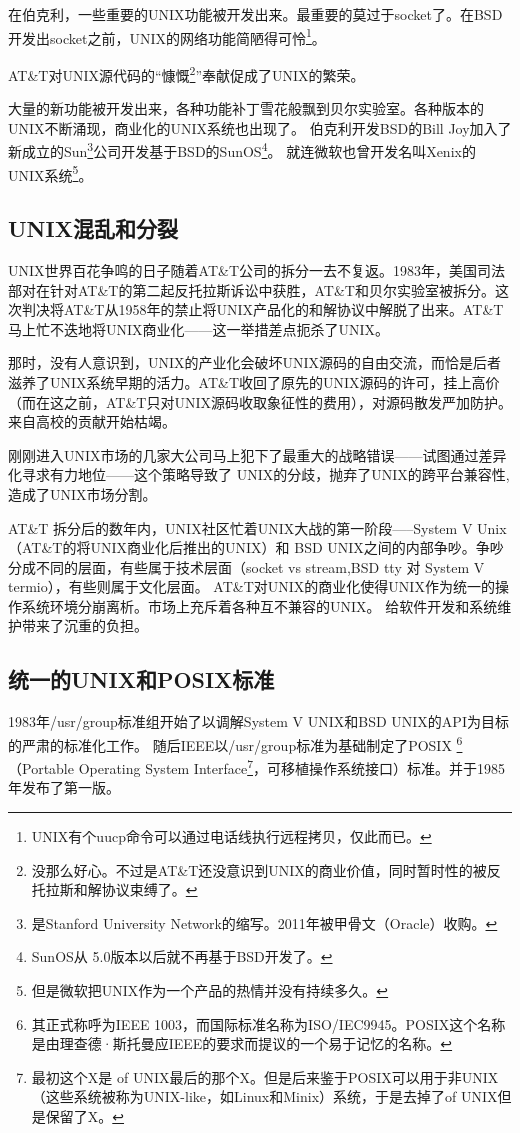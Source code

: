\documentclass[amstex]{ctexbook}
\begin{document}
在伯克利，一些重要的UNIX功能被开发出来。最重要的莫过于socket了。在BSD开发出socket之前，UNIX的网络功能简陋得可怜\footnote{UNIX有个uucp命令可以通过电话线执行远程拷贝，仅此而已。}。


AT\&T对UNIX源代码的“慷慨\footnote{没那么好心。不过是AT\&T还没意识到UNIX的商业价值，同时暂时性的被反托拉斯和解协议束缚了。}”奉献促成了UNIX的繁荣。

大量的新功能被开发出来，各种功能补丁雪花般飘到贝尔实验室。各种版本的UNIX不断涌现，商业化的UNIX系统也出现了。
伯克利开发BSD的Bill Joy加入了新成立的Sun\footnote{是Stanford University Network的缩写。2011年被甲骨文（Oracle）收购。}公司开发基于BSD的SunOS\footnote{SunOS从 5.0版本以后就不再基于BSD开发了。}。
就连微软也曾开发名叫Xenix的UNIX系统\footnote{但是微软把UNIX作为一个产品的热情并没有持续多久。}。


\subsection{UNIX混乱和分裂}

UNIX世界百花争鸣的日子随着AT\&T公司的拆分一去不复返。1983年，美国司法部对在针对AT\&T的第二起反托拉斯诉讼中获胜，AT\&T和贝尔实验室被拆分。这次判决将AT\&T从1958年的禁止将UNIX产品化的和解协议中解脱了出来。AT\&T马上忙不迭地将UNIX商业化------这一举措差点扼杀了UNIX。

那时，没有人意识到，UNIX的产业化会破坏UNIX源码的自由交流，而恰是后者滋养了UNIX系统早期的活力。AT\&T收回了原先的UNIX源码的许可，挂上高价（而在这之前，AT\&T只对UNIX源码收取象征性的费用），对源码散发严加防护。来自高校的贡献开始枯竭。

刚刚进入UNIX市场的几家大公司马上犯下了最重大的战略错误------试图通过差异化寻求有力地位------这个策略导致了
UNIX的分歧，抛弃了UNIX的跨平台兼容性,造成了UNIX市场分割。

AT\&T 拆分后的数年内，UNIX社区忙着UNIX大战的第一阶段-----System V Unix（AT\&T的将UNIX商业化后推出的UNIX）和 BSD UNIX之间的内部争吵。争吵分成不同的层面，有些属于技术层面（socket vs stream,BSD tty 对 System V termio），有些则属于文化层面。
AT\&T对UNIX的商业化使得UNIX作为统一的操作系统环境分崩离析。市场上充斥着各种互不兼容的UNIX。
给软件开发和系统维护带来了沉重的负担。

\subsection{统一的UNIX和POSIX标准}

1983年/usr/group标准组开始了以调解System V UNIX和BSD UNIX的API为目标的严肃的标准化工作。
随后IEEE以/usr/group标准为基础制定了POSIX
\footnote{其正式称呼为IEEE 1003，而国际标准名称为ISO/IEC9945。POSIX这个名称是由理查德·斯托曼应IEEE的要求而提议的一个易于记忆的名称。}
（Portable Operating System Interface\footnote{最初这个X是 of UNIX最后的那个X。但是后来鉴于POSIX可以用于非UNIX（这些系统被称为UNIX-like，如Linux和Minix）系统，于是去掉了of UNIX但是保留了X。 }，可移植操作系统接口）标准。并于1985年发布了第一版。
\end{document}
